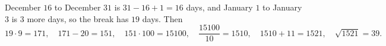 December $16$ to December $31$ is $31-16+1=16$ days, and January $1$ to January $3$ is $3$ more days, so the break has $19$ days. Then
\[
19\cdot9=171,\quad 171-20=151,\quad 151\cdot100=15100,\quad \dfrac{15100}{10}=1510,\quad 1510+11=1521,\quad \sqrt{1521}=\boxed{39}.
\]
